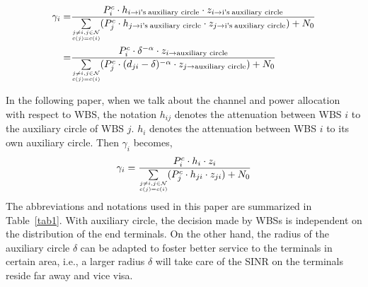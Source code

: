 \documentclass[times]{ettauth}
\newcommand{\ie}{i.e., }
\theoremstyle{mytheoremstyle}
\theoremstyle{mytheoremstyle}
\theoremstyle{mytheoremstyle}
\begin{document}
\begin{equation}
\label{quasiSINR}
\begin{aligned}
 \gamma_{i} = &\frac{P_{i}^c \cdot h_{i\rightarrow \text{i's}\hspace{0.2em} \text{auxiliary circle}}\cdot z_{i\rightarrow \text{i's}\hspace{0.2em}\text{auxiliary circle}}} {\sum\limits_{\tiny\substack{j\neq i, j\in \mathcal{N}\\c(j)=c(i)}} (P_j^c \cdot h_{j\rightarrow \text{i's}\hspace{0.2em} \text{auxiliary circle}} \cdot z_{j\rightarrow \text{i's}\hspace{0.2em} \text{auxiliary circle}}) + N_0}\\
 = & \frac{P_{i}^c \cdot \delta^{-\alpha}\cdot z_{i\rightarrow \text{auxiliary circle}}} {\sum\limits_{\tiny\substack{j\neq i, j\in \mathcal{N}\\c(j)=c(i)}} (P_j^c \cdot (d_{ji}-\delta)^{-\alpha} \cdot z_{j\rightarrow \text{auxiliary circle}}) + N_0}
\end{aligned}
\end{equation}

In the following paper, when we talk about the channel and power allocation with respect to WBS, the notation $h_{ij}$ denotes the attenuation between WBS $i$ to the auxiliary circle of WBS $j$.
$h_{i}$ denotes the attenuation between WBS $i$ to its own auxiliary circle.
Then $\gamma_i$ becomes,
\begin{equation}
\label{quasiSINR_2}
\begin{aligned}
 \gamma_{i} = 
  \frac{P_{i}^c \cdot h_i\cdot z_i} {\sum\limits_{\tiny\substack{j\neq i, j\in \mathcal{N}\\c(j)=c(i)}} (P_j^c \cdot h_{ji} \cdot z_{ji}) + N_0}
\end{aligned}
\end{equation}
The abbreviations and notations used in this paper are summarized in Table~\ref{tab1}.
%
With auxiliary circle, the decision made by WBSs is independent on the distribution of the end terminals.
On the other hand, the radius of the auxiliary circle $\delta$ can be adapted to foster better service to the terminals in certain area, \ie a larger radius $\delta$ will take care of the SINR on the terminals reside far away and vice visa.
\end{document}
